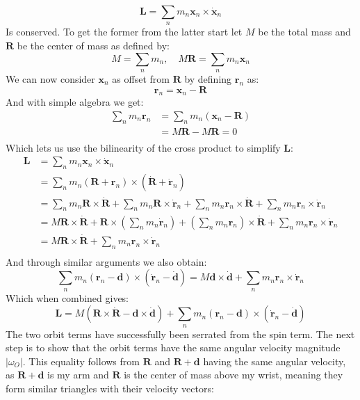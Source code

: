 \[\mathbf{L} = \sum_nm_n\mathbf{x}_n\times\dot{\mathbf{x}}_n\]
Is conserved.
To get the former from the latter start let $M$ be the total mass and $\mathbf{R}$ be the center of mass as defined by:
\[M=\sum_nm_n,\quad M\mathbf{R}=\sum_nm_n\mathbf{x}_n\]
We can now consider $\mathbf{x}_n$ as offset from $\mathbf{R}$ by defining $\mathbf{r}_n$ as:
\[\mathbf{r}_n = \mathbf{x}_n-\mathbf{R}\]
And with simple algebra we get:
\[\begin{aligned}
	\sum_nm_n\mathbf{r}_n &= \sum_nm_n(\mathbf{x}_n-\mathbf{R})\\
	&= M\mathbf{R}-M\mathbf{R} = 0\\
\end{aligned}\]
Which lets us use the bilinearity of the cross product to simplify $\mathbf{L}$:
\[\begin{aligned}
	\mathbf{L}&=\sum_nm_n\mathbf{x}_n\times\dot{\mathbf{x}}_n\\
	&=\sum_nm_n(\mathbf{R}+\mathbf{\mathbf{r}}_n)\times(\dot{\mathbf{R}}+\dot{\mathbf{r}}_n)\\
	&=\sum_nm_n\mathbf{R}\times\dot{\mathbf{R}}+\sum_nm_n\mathbf{R}\times\dot{\mathbf{r}}_n+\sum_nm_n\mathbf{\mathbf{r}}_n\times\dot{\mathbf{R}}+\sum_nm_n\mathbf{\mathbf{r}}_n\times\dot{\mathbf{r}}_n\\
	&=M\mathbf{R}\times\dot{\mathbf{R}}+\mathbf{R}\times\left(\sum_nm_n\dot{\mathbf{r}}_n\right)+\left(\sum_nm_n\mathbf{\mathbf{r}}_n\right)\times\dot{\mathbf{R}}+\sum_nm_n\mathbf{\mathbf{r}}_n\times\dot{\mathbf{r}}_n\\
	&=M\mathbf{R}\times\dot{\mathbf{R}}+\sum_nm_n\mathbf{\mathbf{r}}_n\times\dot{\mathbf{r}}_n\\
\end{aligned}\]
And through similar arguments we also obtain:
\[\sum_nm_n(\mathbf{\mathbf{r}}_n-\mathbf{d})\times(\dot{\mathbf{r}}_n-\dot{\mathbf{d}})=M\mathbf{d}\times\dot{\mathbf{d}}+\sum_nm_n\mathbf{\mathbf{r}}_n\times\dot{\mathbf{r}}_n\]
Which when combined gives:
\[\mathbf{L}=M(\mathbf{R}\times\dot{\mathbf{R}}-\mathbf{d}\times\dot{\mathbf{d}})+\sum_n m_n(\mathbf{\mathbf{r}}_n-\mathbf{d})\times(\dot{\mathbf{r}}_n-\dot{\mathbf{d}})\]
The two orbit terms have successfully been serrated from the spin term.
The next step is to show that the orbit terms have the same angular velocity magnitude $|\omega_O|$.
This equality follows from $\mathbf{R}$ and $\mathbf{R+d}$ having the same angular velocity,
as $\mathbf{R+d}$ is my arm and $\mathbf{R}$ is the center of mass above my wrist,
meaning they form similar triangles with their velocity vectors:


